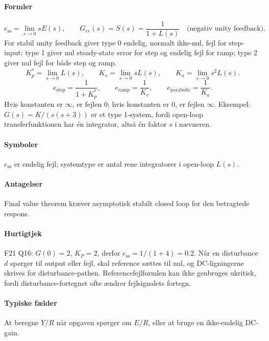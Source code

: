 \paragraph{Formler}
\begin{equation}
\label{eq:steady-state-error}
e_{\mathrm{ss}}=\lim_{s\to0}sE(s),\qquad
G_{er}(s)=S(s)=\frac1{1+L(s)}\quad\text{(negativ unity feedback)}.
\end{equation}
For stabil unity feedback giver type 0 endelig, normalt ikke-nul, fejl for step-input;
type 1 giver nul steady-state error for step og endelig fejl for ramp; type 2 giver
nul fejl for både step og ramp.
\begin{equation}
\label{eq:static-error-constants}
K_p^\ast=\lim_{s\to0}L(s),\qquad
K_v=\lim_{s\to0}sL(s),\qquad
K_a=\lim_{s\to0}s^2L(s).
\end{equation}
\begin{equation}
\label{eq:standard-input-errors}
e_{\mathrm{step}}=\frac1{1+K_p^\ast},\qquad
e_{\mathrm{ramp}}=\frac1{K_v},\qquad
e_{\mathrm{parabolic}}=\frac1{K_a}.
\end{equation}
Hvis konstanten er \(\infty\), er fejlen \(0\); hvis konstanten er \(0\), er fejlen
\(\infty\). Eksempel: \(G(s)=K/(s(s+3))\) er et type 1-system, fordi open-loop
transferfunktionen har én integrator, altså én faktor \(s\) i nævneren.

\paragraph{Symboler}
\(e_{\mathrm{ss}}\) er endelig fejl; systemtype er antal rene integratorer i open-loop
\(L(s)\).

\paragraph{Antagelser}
Final value theorem kræver asymptotisk stabilt closed loop for den betragtede respons.

\paragraph{Hurtigtjek}
F21 Q16: \(G(0)=2\), \(K_P=2\), derfor \(e_{\mathrm{ss}}=1/(1+4)=0.2\).
Når en disturbance \(d\) spørger til output eller fejl, skal reference sættes til nul,
og DC-ligningerne skrives for disturbance-pathen. Referencefejlformlen kan ikke
genbruges ukritisk, fordi disturbance-fortegnet ofte ændrer fejlsignalets fortegn.

\paragraph{Typiske fælder}
At beregne \(Y/R\) når opgaven spørger om \(E/R\), eller at bruge en ikke-endelig DC-gain.

